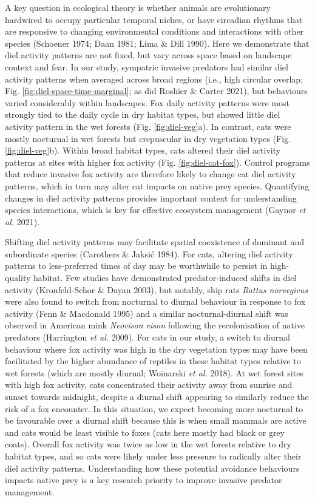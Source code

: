\documentclass[11pt,a4paper,titlepage,twoside,openright]{style/unimelbthesis}
\begin{document}
\begin{mainmatter}
A key question in ecological theory is whether animals are evolutionary hardwired to occupy particular temporal niches, or have circadian rhythms that are responsive to changing environmental conditions and interactions with other species (Schoener 1974; Daan 1981; Lima \& Dill 1990). Here we demonstrate that diel activity patterns are not fixed, but vary across space based on landscape context and fear. In our study, sympatric invasive predators had similar diel activity patterns when averaged across broad regions (i.e., high circular overlap; Fig. \ref{fig:diel-space-time-marginal}; as did Roshier \& Carter 2021), but behaviours varied considerably within landscapes. Fox daily activity patterns were most strongly tied to the daily cycle in dry habitat types, but showed little diel activity pattern in the wet forests (Fig. \ref{fig:diel-veg}a). In contrast, cats were mostly nocturnal in wet forests but crepuscular in dry vegetation types (Fig. \ref{fig:diel-veg}b). Within broad habitat types, cats altered their diel activity patterns at sites with higher fox activity (Fig. \ref{fig:diel-cat-fox}). Control programs that reduce invasive fox activity are therefore likely to change cat diel activity patterns, which in turn may alter cat impacts on native prey species. Quantifying changes in diel activity patterns provides important context for understanding species interactions, which is key for effective ecosystem management (Gaynor \emph{et al.} 2021).

Shifting diel activity patterns may facilitate spatial coexistence of dominant and subordinate species (Carothers \& Jaksić 1984). For cats, altering diel activity patterns to less-preferred times of day may be worthwhile to persist in high-quality habitat. Few studies have demonstrated predator-induced shifts in diel activity (Kronfeld-Schor \& Dayan 2003), but notably, ship rats \emph{Rattus norvegicus} were also found to switch from nocturnal to diurnal behaviour in response to fox activity (Fenn \& Macdonald 1995) and a similar nocturnal-diurnal shift was observed in American mink \emph{Neovison vison} following the recolonisation of native predators (Harrington \emph{et al.} 2009). For cats in our study, a switch to diurnal behaviour where fox activity was high in the dry vegetation types may have been facilitated by the higher abundance of reptiles in these habitat types relative to wet forests (which are mostly diurnal; Woinarski \emph{et al.} 2018). At wet forest sites with high fox activity, cats concentrated their activity away from sunrise and sunset towards midnight, despite a diurnal shift appearing to similarly reduce the risk of a fox encounter. In this situation, we expect becoming more nocturnal to be favourable over a diurnal shift because this is when small mammals are active and cats would be least visible to foxes (cats here mostly had black or grey coats). Overall fox activity was twice as low in the wet forests relative to dry habitat types, and so cats were likely under less pressure to radically alter their diel activity patterns. Understanding how these potential avoidance behaviours impacts native prey is a key research priority to improve invasive predator management.


\end{mainmatter}
\end{document}
